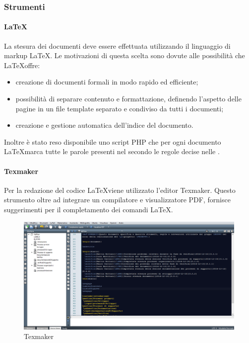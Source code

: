 \subsubsection{Strumenti}
\label{sec:Strumenti}
 \paragraph{\LaTeX}
La stesura dei documenti deve essere effettuata utilizzando il linguaggio di markup \LaTeX. Le motivazioni di questa scelta sono dovute alle possibilità che \LaTeX offre:
\begin{itemize}
	\item creazione di documenti formali in modo rapido ed efficiente;
	\item possibilità di separare contenuto e formattazione, definendo l'aspetto delle pagine in un file
template separato e condiviso da tutti i documenti;
	\item creazione e gestione automatica dell'indice del documento.
\end{itemize}
Inoltre è stato reso disponibile uno script PHP che per ogni documento \LaTeX marca tutte  le parole presenti nel \Gldoc{} secondo le regole decise nelle \NPdoc.
 \paragraph{Texmaker}
Per la redazione del codice \LaTeX viene utilizzato l'editor Texmaker. Questo
strumento oltre ad integrare un compilatore e visualizzatore PDF, fornisce suggerimenti per il completamento dei comandi \LaTeX.
\begin{figure}[h]
\centering
\includegraphics[scale=0.3]{img/texm.png}
\caption{Texmaker}\label{sec:Figura2}
\end{figure}
